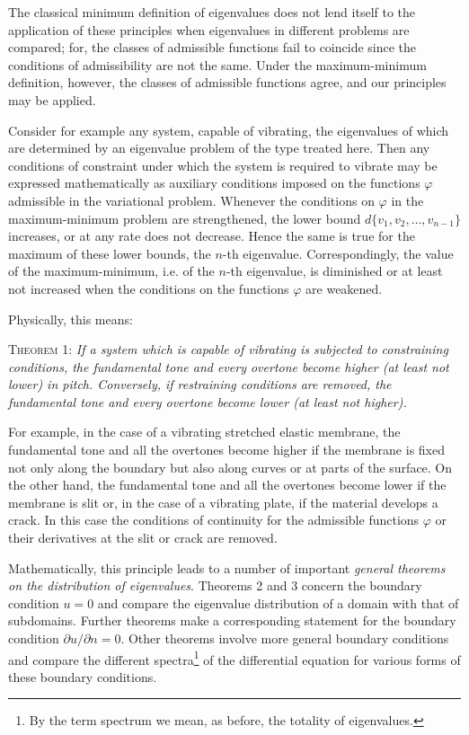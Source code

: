 The classical minimum definition of eigenvalues does not lend itself to the application of these principles when eigenvalues in different problems are compared; for, the classes of admissible functions fail to coincide since the conditions of admissibility are not the same. Under the maximum-minimum definition, however, the classes of admissible functions agree, and our principles may be applied.

Consider for example any system, capable of vibrating, the eigenvalues of which are determined by an eigenvalue problem of the type treated here. Then any conditions of constraint under which the system is required to vibrate may be expressed mathematically as auxiliary conditions imposed on the functions $\varphi$ admissible in the variational problem. Whenever the conditions on $\varphi$ in the maximum-minimum problem are strengthened, the lower bound $d\{v_1,\allowbreak v_2,\allowbreak\ldots,\allowbreak v_{n-1}\}$ increases, or at any rate does not decrease. Hence the same is true for the maximum of these lower bounds, the $n$-th eigenvalue. Correspondingly, the value of the maximum-minimum, i.e. of the $n$-th eigenvalue, is diminished or at least not increased when the conditions on the functions $\varphi$ are weakened.

Physically, this means:

\textsc{Theorem 1:} \emph{If a system which is capable of vibrating is subjected to constraining conditions, the fundamental tone and every overtone become higher (at least not lower) in pitch. Conversely, if restraining conditions are removed, the fundamental tone and every overtone become lower (at least not higher).}

For example, in the case of a vibrating stretched elastic membrane, the fundamental tone and all the overtones become higher if the membrane is fixed not only along the boundary but also along curves or at parts of the surface. On the other hand, the fundamental tone and all the overtones become lower if the membrane is slit or, in the case of a vibrating plate, if the material develops a crack. In this case the conditions of continuity for the admissible functions $\varphi$ or their derivatives at the slit or crack are removed.

Mathematically, this principle leads to a number of important \emph{general theorems on the distribution of eigenvalues}. Theorems 2 and 3 concern the boundary condition $u=0$ and compare the eigenvalue distribution of a domain with that of subdomains. Further theorems make a corresponding statement for the boundary condition $\partial u/\partial n=0$. Other theorems involve more general boundary conditions and compare the different spectra\footnote{By the term spectrum we mean, as before, the totality of eigenvalues.} of the differential equation for various forms of these boundary conditions.

